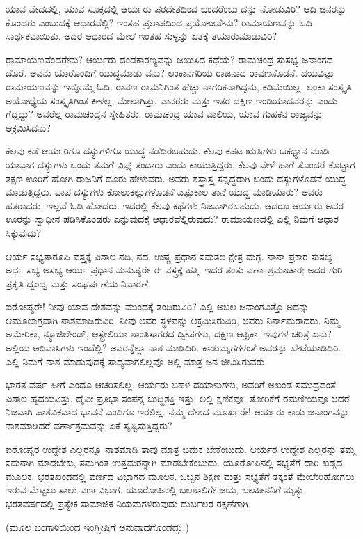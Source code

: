 ಯಾವ ವೇದದಲ್ಲಿ, ಯಾವ ಸೂಕ್ತದಲ್ಲಿ ಆರ್ಯರು ಪರದೇಶದಿಂದ ಬಂದರೆಂಬು ದನ್ನು ನೋಡುವಿರಿ? ಆದಿ ಜನರನ್ನು ಕೊಂದರು ಎಂಬುದಕ್ಕೆ ಆಧಾರವೆಲ್ಲಿ? ಇಂತಹ ಪ್ರಲಾಪದಿಂದ ಪ್ರಯೋಜವೇನು? ರಾಮಾಯಣವನ್ನು ಓದಿ ಸಾರ್ಥಕವಾಯಿತು. ಅದರ ಆಧಾರದ ಮೇಲೆ ಇಂತಹ ಸುಳ್ಳನ್ನು ಏತಕ್ಕೆ ತಯಾರುಮಾಡುವಿರಿ?

ರಾಮಾಯಣವೆಂದರೇನು? ಆರ್ಯರು ದಂಡಕಾರಣ್ಯವನ್ನು ಜಯಿಸಿದ ಕಥೆಯೆ? ರಾಮಚಂದ್ರ ಸುಸಭ್ಯ ಜನಾಂಗದ ದೊರೆ. ಅವನು ಯಾರೊಂದಿಗೆ ಯುದ್ಧಮಾಡು ವನು? ಲಂಕಾನಗರಿಯ ರಾಜನಾದ ರಾವಣನೊಡನೆ. ದಯವಿಟ್ಟು ರಾಮಾಯಣವನ್ನು ಇನ್ನೊಮ್ಮೆ ಓದಿ. ರಾವಣ ರಾಮನಿಗಿಂತ ಹೆಚ್ಚು ನಾಗರಿಕನಾಗಿದ್ದನು, ಕಡಿಮೆಯಿಲ್ಲ. ಲಂಕಾ ಸಂಸ್ಕೃತಿ ಅಯೋಧ್ಯೆಯ ಸಂಸ್ಕೃತಿಗಿಂತ ಕೀಳಲ್ಲ, ಮೇಲಾಗಿತ್ತು. ವಾನರರು ಮತ್ತು ಇತರ ದಕ್ಷಿಣ ಇಂಡಿಯಾದವರನ್ನು ಎಂದು ಗೆದ್ದದ್ದು? ಅವರೆಲ್ಲ ರಾಮಚಂದ್ರನ ಸ್ನೇಹಿತರು. ರಾಮಚಂದ್ರ ಯಾವ ವಾಲಿಯ, ಯಾವ ಗುಹಕನ ರಾಜ್ಯವನ್ನು ಆಕ್ರಮಿಸಿದನು?

ಕೆಲವು ಕಡೆ ಆರ್ಯರಿಗೂ ದಸ್ಯುಗಳಿಗೂ ಯುದ್ಧ ನಡೆದಿರಬಹುದು. ಕೆಲವು ಕಪಟ ಋಷಿಗಳು ಬಕಧ್ಯಾನ ಮಾಡಿ ಯಾವಾಗ ದಸ್ಯುಗಳು ಬಂದು ತಮಗೆ ವಿಘ್ನ ತಂದಾರು ಎಂದು ಕಾಯುತ್ತಿದ್ದರು, ಕೆಲವು ವೇಳೆ ಹಾಗೆ ತೊಂದರೆ ಕೊಟ್ಟಾಗ ತಕ್ಷಣ ಊರಿಗೆ ಹೋಗಿ ರಾಜನಿಗೆ ದೂರು ಹೇಳುವರು. ಅವರು ಶಸ್ತ್ರಾಸ್ತ್ರ ಸನ್ನದ್ಧರಾಗಿ ಬಂದು ದಸ್ಯುಗಳೊಡನೆ ಯುದ್ಧ ಮಾಡುತ್ತಿದ್ದರು. ಪಾಪ ದಸ್ಯುಗಳು ಕೋಲುಕಲ್ಲುಗಳೊಡನೆ ಎಷ್ಟುಕಾಲ ತಾನೆ ಯುದ್ಧ ಮಾಡಿಯಾರು? ಅವರು ಹತರಾದರು, ಇಲ್ಲವೆ ಓಡಿ ಹೋದರು. ಇದರಲ್ಲಿ ಕೆಲವು ಕಥೆಗಳು ನಿಜವಾಗಿರಬಹುದು. ಆದರೂ ಆರ್ಯರು ಅವರ ಊರನ್ನು ಸ್ವಾಧೀನ ಪಡಿಸಿಕೊಂಡರು ಎನ್ನುವುದಕ್ಕೆ ಆಧಾರವೆಲ್ಲಿರುವುದು? ರಾಮಾಯಣದಲ್ಲಿ ಎಲ್ಲಿ ನಿಮಗೆ ಆಧಾರ ಸಿಕ್ಕುವುದು?

ಆರ್ಯ ಸಭ್ಯತಾರೂಪಿ ವಸ್ತ್ರಕ್ಕೆ ವಿಶಾಲ ನದಿ, ನದ, ಉಷ್ಣ ಪ್ರಧಾನ ಸಮತಲ ಕ್ಷೇತ್ರ ಮಗ್ಗ. ನಾನಾ ಪ್ರಕಾರ ಸುಸಭ್ಯ, ಅರ್ಧ ಸಭ್ಯ ಅಸಭ್ಯ ಆರ್ಯ ಪ್ರಧಾನ ಮನುಷ್ಯರೇ ಈ ವಸ್ತ್ರಕ್ಕೆ ಹತ್ತಿ. ಇದರ ತಂತು ವರ್ಣಾಶ್ರಮಾಚಾರ; ಅದರ ಗುರಿ ಪ್ರಕೃತಿ ದ್ವಂದ್ವ ಮತ್ತು ಸಂಘರ್ಷಣೆಯ ನಿವಾರಣೆ.

ಐರೋಪ್ಯರೇ! ನೀವು ಯಾವ ದೇಶವನ್ನು ಮುಂದಕ್ಕೆ ತಂದಿರುವಿರಿ? ಎಲ್ಲಿ ಅಬಲ ಜನಾಂಗವಿತ್ತೊ ಅದನ್ನು ಆಮೂಲಾಗ್ರವಾಗಿ ನಾಶಮಾಡಿರುವಿರಿ. ನೀವು ಅವರ ಸ್ಥಳವನ್ನು ಆಕ್ರಮಿಸಿರುವಿರಿ, ಅವರು ನಿರ್ನಾಮರಾದರು. ನಿಮ್ಮ ಅಮೇರಿಕಾ, ನ್ಯೂಜಿಲೇಂಡ್​, ಆಸ್ಟ್ರೇಲಿಯಾ ಶಾಂತಿಸಾಗರದ ದ್ವೀಪಗಳು, ದಕ್ಷಿಣ ಆಫ್ರಿಕಾ, ಇವುಗಳ ಚರಿತ್ರೆ ಏನು? ಅಲ್ಲಿಯ ಆದಿವಾಸಿಗಳು ಇಂದೆಲ್ಲಿ? ಅವರನ್ನೆಲ್ಲಾ ನಾಶ ಮಾಡಿದಿರಿ. ಕಾಡುಮೃಗಗಳಂತೆ ಅವರನ್ನು ಬೇಟೆಯಾಡಿದಿರಿ. ಎಲ್ಲಿ ನಿಮಗೆ ನಾಶ ಮಾಡುವುದಕ್ಕೆ ಸಾಧ್ಯವಾಗಲಿಲ್ಲವೊ ಅಲ್ಲಿ ಮಾತ್ರ ಜನ ಜೀವಿಸಿರುವರು.

ಭಾರತ ವರ್ಷ ಹೀಗೆ ಎಂದೂ ಆಚರಿಸಲಿಲ್ಲ. ಆರ್ಯರು ಬಹಳ ದಯಾಳುಗಳು, ಅವರಿಗೆ ಅಖಂಡ ಸಮುದ್ರದಂತೆ ವಿಶಾಲ ಹೃದಯವಿತ್ತು. ದೈವೀ ಪ್ರತಿಭಾ ಸಂಪನ್ನ ಬುದ್ಧಿಶಕ್ತಿ ಇತ್ತು. ಅಲ್ಲಿ ಕ್ಷಣಿಕವೂ, ತೋರಿಕೆಗೆ ರಮಣೀಯವೂ ಆದರೆ ನಿಜವಾಗಿ ಪಾಶವಿಕ\break ವಾದ ಭಾವನೆ ಎಂದಿಗೂ ಇರಲಿಲ್ಲ. ನಮ್ಮ ದೇಶದ ಮೂರ್ಖರೇ! ಆರ್ಯರು ಕಾಡು ಜನಾಂಗವನ್ನು ನಾಶಮಾಡಿದರೆ ವರ್ಣಾಶ್ರಮವನ್ನು ಏಕೆ ಸೃಷ್ಟಿಸುತ್ತಿದ್ದರು?

ಐರೋಪ್ಯರ ಉದ್ದೇಶ ಎಲ್ಲರನ್ನೂ ನಾಶಮಾಡಿ ತಾವು ಮಾತ್ರ ಬದುಕ ಬೇಕೆಂಬುದು. ಆರ್ಯರ ಉದ್ದೇಶ ಎಲ್ಲರನ್ನು ತಮ್ಮ ಸಮನಾಗಿ ಮಾಡಬೇಕು, ತಮಗಿಂತ ಉತ್ತಮರನ್ನಾಗಿ ಮಾಡಬೇಕೆಂಬುದು. ಯೂರೋಪಿನಲ್ಲಿ ಸಭ್ಯತೆಗೆ ದಾರಿ ಖಡ್ಗದ ಮೂಲಕ. ಭರತಖಂಡದಲ್ಲಿ ವರ್ಣದ ವಿಭಾಗದ ಮೂಲಕ. ಒಬ್ಬನ ಶಿಕ್ಷಣ ಮತ್ತು ಸಭ್ಯತೆಗೆ ತಕ್ಕಂತೆ ಮೇಲೇರಿಹೋಗಲು ಇರುವ ಮೆಟ್ಟಲು ಸಾಲು ವರ್ಣವಿಭಾಗ. ಯೂರೋಪಿನಲ್ಲಿ ಬಲ\break ಶಾಲಿಗೇ ಜಯ, ಬಲಹೀನನಿಗೆ ಮೃತ್ಯು. ಭರತವರ್ಷದಲ್ಲಿ ಪ್ರತ್ಯೇಕ ಸಾಮಾಜಿಕ ನಿಯಮ\break ಗಳಿರುವುದು ದುರ್ಬಲರ ರಕ್ಷಣೆಗಾಗಿ.

\begin{center}
(ಮೂಲ ಬಂಗಾಳಿಯಿಂದ ಇಂಗ್ಲೀಷಿಗೆ ಅನುವಾದಗೊಂಡದ್ದು.)
\end{center}

